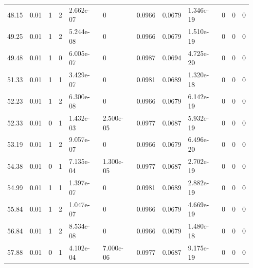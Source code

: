\documentclass[preview]{standalone}
\begin{document}
{{{\begin{tabular}{L{1.2cm}C{1.2cm} C{0.3cm}C{0.5cm} C{1.4cm}C{1.4cm} C{1.4cm}C{1.4cm} C{1.6cm}C{1.6cm} C{1.6cm}C{1.6cm}}
  48.15  &  0.01  & 1     &  2 &  2.662e-07  & 0  &  0.0966&   0.0679& 1.346e-19 & 0   &  0 & 0  \\ 
  49.25  &  0.01  & 1     &  2 &  5.244e-08  & 0  &  0.0966&   0.0679& 1.510e-19 & 0   &  0 & 0  \\ 
  49.48  &  0.01  & 1     &  0 &  6.005e-07  & 0  &  0.0987&   0.0694& 4.725e-20 & 0   &  0 & 0  \\ 
  51.33  &  0.01  & 1     &  1 &  3.429e-07  & 0  &  0.0981&   0.0689& 1.320e-18 & 0   &  0 & 0  \\ 
  52.23  &  0.01  & 1     &  2 &  6.300e-08  & 0  &  0.0966&   0.0679& 6.142e-19 & 0   &  0 & 0  \\ 
  52.33  &  0.01  & 0     &  1 &  1.432e-03  & 2.500e-05  &  0.0977&   0.0687& 5.932e-19 & 0   &  0 & 0  \\ 
  53.19  &  0.01  & 1     &  2 &  9.057e-07  & 0  &  0.0966&   0.0679& 6.496e-20 & 0   &  0 & 0  \\ 
  54.38  &  0.01  & 0     &  1 &  7.135e-04  & 1.300e-05  &  0.0977&   0.0687& 2.702e-19 & 0   &  0 & 0  \\ 
  54.99  &  0.01  & 1     &  1 &  1.397e-07  & 0  &  0.0981&   0.0689& 2.882e-19 & 0   &  0 & 0  \\ 
  55.84  &  0.01  & 1     &  2 &  1.047e-07  & 0  &  0.0966&   0.0679& 4.669e-19 & 0   &  0 & 0  \\ 
  56.84  &  0.01  & 1     &  2 &  8.534e-08  & 0  &  0.0966&   0.0679& 1.480e-18 & 0   &  0 & 0  \\ 
  57.88  &  0.01  & 0     &  1 &  4.102e-04  & 7.000e-06  &  0.0977&   0.0687& 9.175e-19 & 0   &  0 & 0  \\ 
\hline 
\end{tabular} 

}}}
\end{document}
